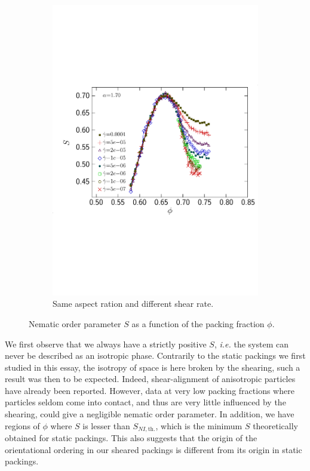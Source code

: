 \documentclass[class=article, float=false, crop=false]{standalone}
\begin{document}
\begin{figure}[h!]
\begin{subfigure}[t]{0.49\textwidth}
        \includegraphics[width=\textwidth]{figures/figs/S2_phi_1024_KDk500_Ml100_EL170}
        \caption{Same aspect ration and different shear rate.}
    \end{subfigure}
    \hfill
\caption{Nematic order parameter $S$ as a function of the packing fraction $\phi$.}
\label{Sphi_sheared}
\end{figure}

We first observe that we always have a strictly positive $S$, \textit{i.e.} the system can never be described as an isotropic phase. Contrarily to the static packings we first studied in this essay, the isotropy of space is here broken by the shearing, such a result was then to be expected. Indeed, shear-alignment of anisotropic particles have already been reported. \cite{borzsonyi2012orientational} However, data at very low packing fractions where particles seldom come into contact, and thus are very little influenced by the shearing, could give a negligible nematic order parameter. In addition, we have regions of $\phi$ where $S$ is lesser than $S_{NI,\text{th.}}$, which is the minimum $S$ theoretically obtained for static packings. This also suggests that the origin of the orientational ordering in our sheared packings is different from its origin in static packings.\\
\end{document}
